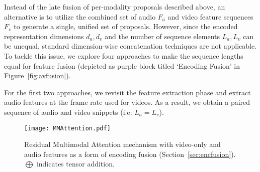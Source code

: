 \documentclass[10pt,twocolumn,letterpaper]{article}
\begin{document}
Instead of the late fusion of per-modality proposals described above, an alternative is to utilize the combined set of audio $F_a$ and video feature sequences $F_v$ to generate a single, unified set of proposals. However, since the encoded representation dimensions $d_a,d_v$ and the number of sequence elements $L_a,L_v$ can be unequal, standard dimension-wise concatenation techniques are not applicable. To tackle this issue, we explore four approaches to make the sequence lengths equal for feature fusion (depicted as purple block titled `Encoding Fusion' in Figure~\ref{fig:avfusion}). 

For the first two approaches, we revisit the feature extraction phase and extract audio features at the frame rate used for videos. As a result, we obtain a paired sequence of audio and video snippets (i.e. $L_a = L_v$).

\begin{figure}[!t]
    \centering
    \noindent
    \texttt{[image: MMAttention.pdf]}
    \caption{Residual Multimodal Attention mechanism with video-only and audio features as a form of encoding fusion (Section~\ref{sec:encfusion}).  $\bigoplus$ indicates tensor addition.}
    \label{fig:mmatt}
\end{figure}
\end{document}
